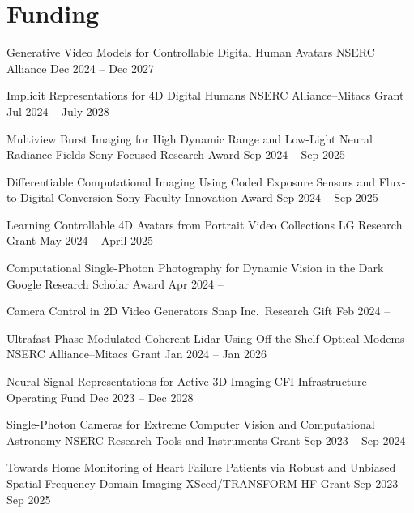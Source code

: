 
\section{Funding}
\begingroup
\let\bfseries\relax

\cventry[0.5em]{}
{Generative Video Models for Controllable Digital Human Avatars}
{NSERC Alliance}
{Dec 2024 -- Dec 2027}
{}
{}

\cventry[0.5em]{}
{Implicit Representations for 4D Digital Humans}
{NSERC Alliance--Mitacs Grant}
{Jul 2024 -- July 2028}
{}
{}

\cventry[0.5em]{}
{\small Multiview Burst Imaging for High Dynamic Range and Low-Light Neural Radiance Fields}
{Sony Focused Research Award}
{Sep 2024 -- Sep 2025}
{}
{}

\cventry[0.5em]{}
{\small Differentiable Computational Imaging Using Coded Exposure Sensors and Flux-to-Digital Conversion}
{Sony Faculty Innovation Award}
{\hspace{-1em}Sep 2024 -- Sep 2025}
{}
{}

\cventry[0.5em]{}
{Learning Controllable 4D Avatars from Portrait Video Collections}
{LG Research Grant}
{May 2024 -- April 2025}
{}
{}

\cventry[0.5em]{}
{Computational Single-Photon Photography for Dynamic Vision in the Dark}
{Google Research Scholar Award}
{Apr 2024 --}
{}
{}

\cventry[0.5em]{}
{Camera Control in 2D Video Generators}
{Snap Inc.\ Research Gift}
{Feb 2024 --}
{}
{}

\cventry[0.5em]{}
{Ultrafast Phase-Modulated Coherent Lidar Using Off-the-Shelf Optical Modems}
{NSERC Alliance--Mitacs Grant}
{Jan 2024 -- Jan 2026}
{}
{}

\cventry[0.5em]{}
{Neural Signal Representations for Active 3D Imaging}
{CFI Infrastructure Operating Fund}
{Dec 2023 -- Dec 2028}
{}
{}

\cventry[0.5em]{}
{Single-Photon Cameras for Extreme Computer Vision and Computational Astronomy}
{NSERC Research Tools and Instruments Grant}
{Sep 2023 -- Sep 2024}
{}
{}

\cventry[0.5em]{}
{\small Towards Home Monitoring of Heart Failure Patients via Robust and Unbiased Spatial Frequency Domain Imaging}
{XSeed/TRANSFORM HF Grant}
{\hspace{-13em}Sep 2023 -- Sep 2025}
{}
{}

